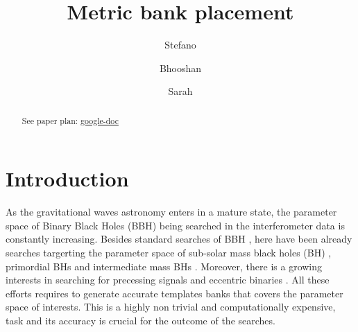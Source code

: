 \documentclass[twocolumn,showpacs,preprintnumbers,nofootinbib,prd,
superscriptaddress,10pt]{revtex4-2}
\begin{document}
\begin{abstract}
	See paper plan: \href{https://docs.google.com/document/d/1O8z0aDlXtV0LyrtK60vaQDzk9iiCsrjj1ThRGX1tX-0/edit}{google-doc}

\end{abstract}
	
	\title{Metric bank placement}
	\author{Stefano }

	\author{Bhooshan }
        
	\author{Sarah }
	\maketitle

	\tableofcontents

\section{Introduction}

As the gravitational waves astronomy enters in a mature state, the parameter space of Binary Black Holes (BBH) being searched in the interferometer data is constantly increasing. Besides standard searches of BBH \cite{GWTC-1,GWTC-2,GWTC-2.1, GWTC-3}, here have been already searches targerting the parameter space of sub-solar mass black holes (BH) \cite{SSM_O2, SSM_O3a, SSM_O3b}, primordial BHs \cite{PBH} and intermediate mass BHs \cite{IMBH_O2, IMBH_O3}. Moreover, there is a growing interests in searching for precessing signals and eccentric binaries \cite{}.
All these efforts requires to generate accurate templates banks that covers the parameter space of interests. This is a highly non trivial and computationally expensive, task and its accuracy is crucial for the outcome of the searches.
\end{document}
